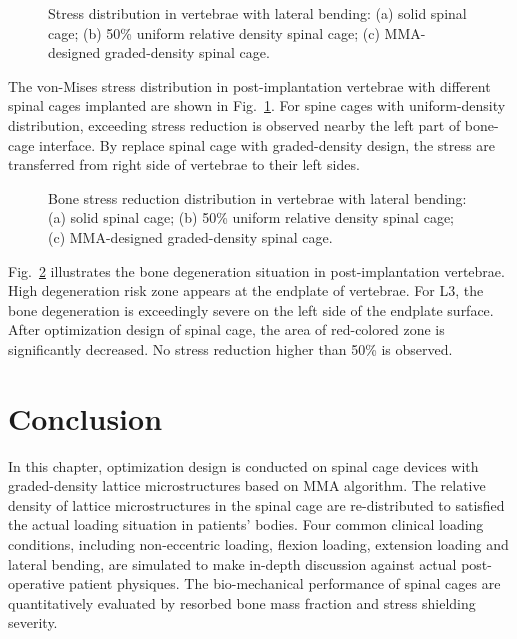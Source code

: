 \documentclass[12pt]{extbook}
\begin{document}
\begin{figure}[htbp]
\centering
{}
\caption{Stress distribution in vertebrae with lateral bending: (a) solid spinal cage; (b) 50\% uniform relative density spinal cage; (c) MMA-designed graded-density spinal cage.}
\label{stress_bending}
\end{figure}

The von-Mises stress distribution in post-implantation vertebrae with different spinal cages implanted are shown in Fig.~\ref{stress_bending}. For spine cages with uniform-density distribution, exceeding stress reduction is observed nearby the left part of bone-cage interface. By replace spinal cage with graded-density design, the stress are transferred from right side of vertebrae to their left sides.\\

\begin{figure}[htbp]
\centering
{}
\caption{Bone stress reduction distribution in vertebrae with lateral bending: (a) solid spinal cage; (b) 50\% uniform relative density spinal cage; (c) MMA-designed graded-density spinal cage.}
\label{mbr_bending}
\end{figure}


Fig.~\ref{mbr_bending} illustrates the bone degeneration situation in post-implantation vertebrae. High degeneration risk zone appears at the endplate of vertebrae. For L3, the bone degeneration is exceedingly severe on the left side of the endplate surface. After optimization design of spinal cage, the area of red-colored zone is significantly decreased. No stress reduction higher than 50\% is observed.\\


\section{Conclusion}

In this chapter, optimization design is conducted on spinal cage devices with graded-density lattice microstructures based on MMA algorithm. The relative density of lattice microstructures in the spinal cage are re-distributed to satisfied the actual loading situation in patients' bodies. Four common clinical loading conditions, including non-eccentric loading, flexion loading, extension loading and lateral bending, are simulated to make in-depth discussion against actual post-operative patient physiques. The bio-mechanical performance of spinal cages are quantitatively evaluated by resorbed bone mass fraction and stress shielding severity.\\
\end{document}
